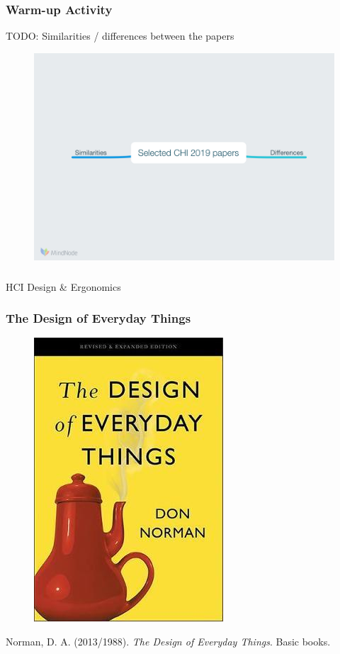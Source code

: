 \documentclass[screen, aspectratio=169]{beamer}
\begin{document}
%
\begin{frame}
\frametitle{Warm-up Activity}
TODO: Similarities / differences between the papers
 \begin{figure}
	\includegraphics[scale=0.28]{img/mindmap-selected-papers.png}
    \end{figure}
\end{frame}
%
\begin{frame}
\frametitle{}
\Huge{HCI Design \& Ergonomics}
\end{frame}
%
\begin{frame}
\frametitle{The Design of Everyday Things}
 \begin{figure}
	\includegraphics[scale=0.35]{img/Donald-Norman-The-Design-of-Everyday-Things.jpg}
    \end{figure}
    Norman, D. A. (2013/1988). \emph{The Design of Everyday Things}. Basic books. \cite{Norman.1988.psychology}
\end{frame}
\end{document}
